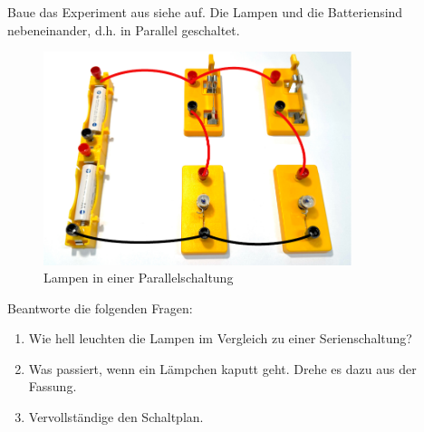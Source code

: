 \newpage
{}

Baue das Experiment aus siehe  auf. Die
Lampen und die Batteriensind nebeneinander, d.h. in Parallel geschaltet.

\begin{figure}[h!]
    \centering
    \includegraphics[width=9cm]{_images/lampen_parallel.pdf}
    \caption{Lampen in einer Parallelschaltung}
    \label{fig:experiment_lamps_parallel}
\end{figure}

Beantworte die folgenden Fragen:

\begin{enumerate}
    \item Wie hell leuchten die Lampen im Vergleich zu einer Serienschaltung?
    \item Was passiert, wenn ein Lämpchen kaputt geht. Drehe es dazu aus der Fassung.
    \item Vervollständige den Schaltplan.
\end{enumerate}

